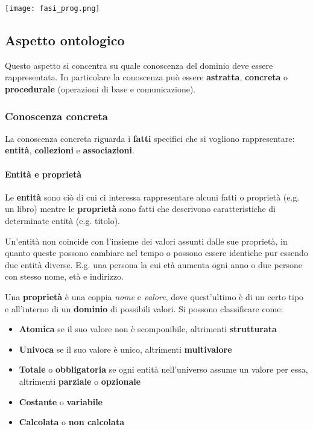 \begin{center}
	\texttt{[image: fasi\_prog.png]}
\end{center}

\subsection{Aspetto ontologico}
Questo aspetto si concentra su quale conoscenza del dominio deve essere rappresentata. In particolare la conoscenza può essere \textbf{astratta}, \textbf{concreta} o \textbf{procedurale} (operazioni di base e comunicazione). 

\subsubsection{Conoscenza concreta}
La conoscenza concreta riguarda i \textbf{fatti} specifici che si vogliono rappresentare: \textbf{entità}, \textbf{collezioni} e \textbf{associazioni}.

\paragraph{Entità e proprietà}
Le \textbf{entità} sono ciò di cui ci interessa rappresentare alcuni fatti o proprietà (e.g. un libro) mentre le \textbf{proprietà} sono fatti che descrivono caratteristiche di determinate entità (e.g. titolo).

\begin{note}
	Un'entità non coincide con l'insieme dei valori assunti dalle sue proprietà, in quanto queste possono cambiare nel tempo o possono essere identiche pur essendo due entità diverse. E.g. una persona la cui età aumenta ogni anno o due persone con stesso nome, età e indirizzo.
\end{note}

Una \textbf{proprietà} è una coppia \textit{nome} e \textit{valore}, dove quest'ultimo è di un certo tipo e all'interno di un \textbf{dominio} di possibili valori. Si possono classificare come:
\begin{itemize}
	\item \textbf{Atomica} se il suo valore non è scomponibile, altrimenti \textbf{strutturata}
	\item \textbf{Univoca} se il suo valore è unico, altrimenti \textbf{multivalore}
	\item \textbf{Totale} o \textbf{obbligatoria} se ogni entità nell'universo assume un valore per essa, altrimenti \textbf{parziale} o \textbf{opzionale}
	\item \textbf{Costante} o \textbf{variabile}
	\item \textbf{Calcolata} o \textbf{non calcolata}
\end{itemize}

